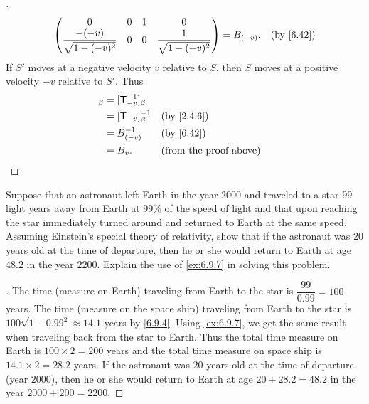 \begin{proof}[]
\begin{align*}
\begin{pmatrix}
                   0                                & 0 & 1 & 0                                \\
                   \dfrac{-(-v)}{\sqrt{1 - (-v)^2}} & 0 & 0 & \dfrac{1}{\sqrt{1 - (-v)^2}}
                 \end{pmatrix} = B_{(-v)}. &  & \by{6.42}
  \end{align*}
  If \(S'\) moves at a negative velocity \(v\) relative to \(S\), then \(S\) moves at a positive velocity \(-v\) relative to \(S'\).
  Thus
  \begin{align*}
    [\T_v]_{\beta} & = [\T_{-v}^{-1}]_{\beta}                                    \\
                   & = [\T_{-v}]_{\beta}^{-1} &  & \by{2.4.6}                    \\
                   & = B_{(-v)}^{-1}          &  & \by{6.42}                     \\
                   & = B_v.                   &  & \text{(from the proof above)}
  \end{align*}
\end{proof}

\begin{ex}\label{ex:6.9.8}
  Suppose that an astronaut left Earth in the year \(2000\) and traveled to a star \(99\) light years away from Earth at \(99\%\) of the speed of light and that upon reaching the star immediately turned around and returned to Earth at the same speed.
  Assuming Einstein's special theory of relativity, show that if the astronaut was \(20\) years old at the time of departure, then he or she would return to Earth at age \(48.2\) in the year \(2200\).
  Explain the use of \cref{ex:6.9.7} in solving this problem.
\end{ex}

\begin{proof}[]
  The time (measure on Earth) traveling from Earth to the star is \(\dfrac{99}{0.99} = 100\) years.
  The time (measure on the space ship) traveling from Earth to the star is \(100 \sqrt{1 - 0.99^2} \approx 14.1\) years by \cref{6.9.4}.
  Using \cref{ex:6.9.7}, we get the same result when traveling back from the star to Earth.
  Thus the total time measure on Earth is \(100 \times 2 = 200\) years and the total time measure on space ship is \(14.1 \times 2 = 28.2\) years.
  If the astronaut was \(20\) years old at the time of departure (year \(2000\)), then he or she would return to Earth at age \(20 + 28.2 = 48.2\) in the year \(2000 + 200 = 2200\).
\end{proof}

